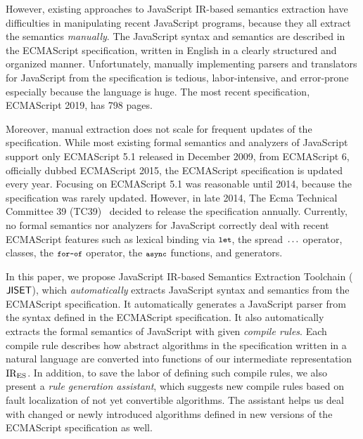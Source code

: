However, existing approaches to JavaScript IR-based semantics
extraction have difficulties in manipulating recent JavaScript
programs, because they all extract the semantics \textit{manually}.
The JavaScript syntax and semantics are described in the ECMAScript
specification, written in English in a clearly structured and
organized manner.  Unfortunately, manually implementing parsers and
translators for JavaScript from the specification is tedious,
labor-intensive, and error-prone especially because the language is
huge.  The most recent specification, ECMAScript 2019, has 798 pages.

Moreover, manual extraction does not scale for frequent updates of the
specification.  While most existing formal semantics and analyzers of
JavaScript support only ECMAScript 5.1 released in December 2009,
from ECMAScript 6, officially dubbed ECMAScript 2015, the 
ECMAScript specification is updated every year.  Focusing on
ECMAScript 5.1 was reasonable until 2014, because the
specification was rarely updated.  However, in late 2014, The Ecma
Technical Committee 39 (TC39)~\cite{tc39} decided to release the
specification annually.  Currently, no formal semantics
nor analyzers for JavaScript correctly deal with recent ECMAScript
features such as lexical binding via \( \texttt{\footnotesize let} \), the spread
\( \texttt{\footnotesize...} \) operator, classes, the \( \texttt{\footnotesize for-of} \) operator,
the \( \texttt{\footnotesize async} \) functions, and generators.

In this paper, we propose JavaScript IR-based Semantics Extraction
Toolchain (\( \text{\sf JISET} \)), which \textit{automatically} extracts JavaScript
syntax and semantics from the ECMAScript specification.  It
automatically generates a JavaScript parser from the syntax defined in
the ECMAScript specification.  It also automatically extracts the
formal semantics of JavaScript with given \textit{compile rules}.
Each compile rule describes how abstract algorithms in the
specification written in a natural language are converted into
functions of our intermediate representation \( \text{IR}_\text{ES} \).  In
addition, to save the labor of defining such compile rules, we also
present a \textit{rule generation assistant}, which suggests new
compile rules based on fault localization of not yet convertible
algorithms.  The assistant helps us deal with changed or newly
introduced algorithms defined in new versions of the ECMAScript
specification as well.

